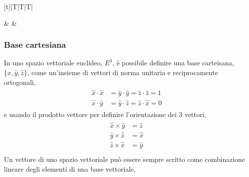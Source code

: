 \documentclass[letterpaper,10pt,italian]{jupyterBook}
\begin{document}
\begin{savenotes}\sphinxattablestart
\centering
\begin{tabulary}{\linewidth}[t]{|T|T|T|}
\hline

\sphinxAtStartPar
{}
&
\sphinxAtStartPar
{}
&
\sphinxAtStartPar
{}
\\
\hline
\end{tabulary}
\par
\sphinxattableend\end{savenotes}


\subsubsection{Base cartesiana}
\label{\detokenize{ch/algebra/vector-algebra-euclidean-space-3d:base-cartesiana}}\label{\detokenize{ch/algebra/vector-algebra-euclidean-space-3d:math-hs-algebra-vector-euclidean-space-3d-cartesian-basis}}
\sphinxAtStartPar
In uno spazio vettoriale euclideo, \(E^3\), è possibile definire una base carteisana, \(\{ \hat{x}, \hat{y}, \hat{z} \}\), come un’insieme di vettori di norma unitaria e reciprocamente ortogonali,
\begin{equation*}
\begin{split}\begin{aligned}
  \hat{x} \cdot  \hat{x} & = \hat{y} \cdot  \hat{y} = \hat{z} \cdot  \hat{z} = 1 \\
  \hat{x} \cdot  \hat{y} & = \hat{y} \cdot  \hat{z} = \hat{z} \cdot  \hat{x} = 0
\end{aligned}\end{split}
\end{equation*}
\sphinxAtStartPar
e usando il prodotto vettore per definire l’orientazione dei 3 vettori,
\begin{equation*}
\begin{split}\begin{aligned}
  \hat{x} \times \hat{y} & = \hat{z} \\
  \hat{y} \times \hat{z} & = \hat{x} \\
  \hat{z} \times \hat{x} & = \hat{y} \\
\end{aligned}\end{split}
\end{equation*}
\sphinxAtStartPar
Un vettore di uno spazio vettoriale può essere sempre scritto come combinazione lineare degli elementi di una base vettoriale,
\end{document}

